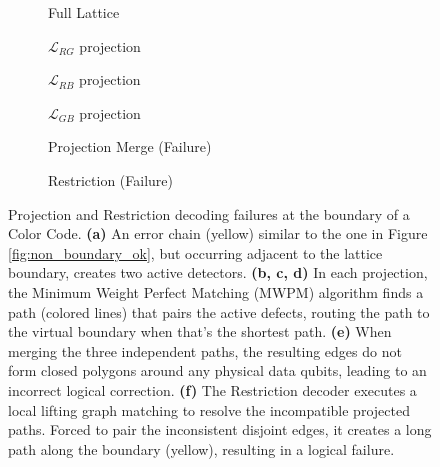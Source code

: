 \begin{figure}[hbtp]
    \centering
    \begin{subfigure}[b]{0.32\textwidth}
        \centering
        \resizebox{\linewidth}{!}{
            
        }
        \caption{Full Lattice}
    \end{subfigure}
    \hfill
    \begin{subfigure}[b]{0.32\textwidth}
        \centering
        \resizebox{\linewidth}{!}{
            
        }
        \caption{$\mathcal{L}_{RG}$ projection}
    \end{subfigure}
    \hfill
    \begin{subfigure}[b]{0.32\textwidth}
        \centering
        \resizebox{\linewidth}{!}{
            
        }
        \caption{$\mathcal{L}_{RB}$ projection}
    \end{subfigure}

    \vspace{0.5cm}

    \begin{subfigure}[b]{0.32\textwidth}
        \centering
        \resizebox{\linewidth}{!}{
            
        }
        \caption{$\mathcal{L}_{GB}$ projection}
    \end{subfigure}
    \hfill
    \begin{subfigure}[b]{0.32\textwidth}
        \centering
        \resizebox{\linewidth}{!}{
            
        }
        \caption{Projection Merge (Failure)}
    \end{subfigure}
    \hfill
    \begin{subfigure}[b]{0.32\textwidth}
        \centering
        \resizebox{\linewidth}{!}{
            
        }
        \caption{Restriction (Failure)}
    \end{subfigure}

    \caption[Failure of the Projection and Restriction decoders at the lattice boundary.]{Projection and Restriction decoding failures at the boundary of a Color Code. \textbf{(a)} An error chain (yellow) similar to the one in Figure \ref{fig:non_boundary_ok}, but occurring adjacent to the lattice boundary, creates two active detectors. \textbf{(b, c, d)} In each projection, the Minimum Weight Perfect Matching (MWPM) algorithm finds a path (colored lines) that pairs the active defects, routing the path to the virtual boundary when that's the shortest path. \textbf{(e)} When merging the three independent paths, the resulting edges do not form closed polygons around any physical data qubits, leading to an incorrect logical correction. \textbf{(f)} The Restriction decoder executes a local lifting graph matching to resolve the incompatible projected paths. Forced to pair the inconsistent disjoint edges, it creates a long path along the boundary (yellow), resulting in a logical failure.}
    \label{fig:boundary_fail}
\end{figure}

